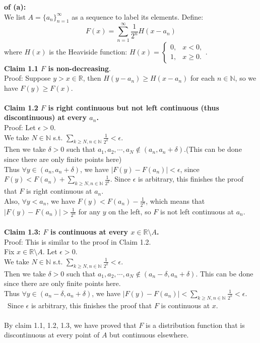 \documentclass[lang=cn,11pt]{elegantbook}
\begin{document}
\begin{solution} \textbf{of (a):}\\
We list \( A = \{a_n\}_{n=1}^{\infty} \) as a sequence to label its elements. Define:
\[
F(x) = \sum_{n=1}^{\infty} \frac{1}{2^n} H(x - a_n)
\]
where \( H(x) \) is the Heaviside function: \(
H(x) =
\begin{cases}
0, & x < 0, \\
1, & x \geq 0.
\end{cases}
\).\\
\textbf{Claim 1.1 $F$ is non-decreasing}.\\
Proof: Suppose $y > x \in \mathbb{R}$, then $H(y-a_n) \geq H(x-a_n)$ for each $n \in \mathbb{N}$, so we have $F(y) \geq F(x)$.\\\\
\textbf{Claim 1.2 $F$ is right continuous but not left continuous (thus discontinuous) at every $a_n$.}\\
Proof: Let $\epsilon > 0$.\\
We take $N \in \mathbb{N}$ s.t. $\sum_{k\geq N, n\in \mathbb{N}} \frac{1}{2^k} < \epsilon$.\\
Then we take $\delta>0$ such that $a_1, a_2,\cdots, a_N \not \in (a_n, a_n+\delta)$.(This can be done since there are only finite points here)\\
Thus $\forall y \in (a_n, a_n+\delta)$, we have $|F(y) - F(a_n)| < \epsilon$, since $F(y) < F(a_n) + \sum_{k\geq N, n\in \mathbb{N}} \frac{1}{2^k}$.
Since $\epsilon$ is arbitrary, this finishes the proof that $F$ is right continuous at $a_n$.\\
Also, $\forall y < a_n$, we have $F(y) < F(a_n) - \frac{1}{2^n}$, which means that $|F(y) -F(a_n)|>\frac{1}{2^n}$ for any $y$ on the left, so $F$ is not left continuous at $a_n$.\\\\
\textbf{Claim 1.3: $F$ is continuous at every $x \in \mathbb{R} \setminus A$.}\\
Proof: This is similar to the proof in Claim 1.2. \\
Fix $x \in \mathbb{R} \setminus A$. Let  $\epsilon > 0$.\\
We take $N \in \mathbb{N}$ s.t. $\sum_{k\geq N, n\in \mathbb{N}} \frac{1}{2^k} < \epsilon$.\\
Then we take $\delta>0$ such that $a_1, a_2,\cdots, a_N \not \in (a_n-\delta, a_n+\delta)$. This can be done since there are only finite points here.\\
Thus $\forall y \in (a_n-\delta, a_n+\delta)$, we have $|F(y) - F(a_n)| <\sum_{k\geq N, n\in \mathbb{N}} \frac{1}{2^k} <  \epsilon$.\\\
Since $\epsilon$ is arbitrary, this finishes the proof that $F$ is continuous at $x$.\\\\

By claim 1.1, 1.2, 1.3, we have proved that $F$ is a distribution function that is discontinuous at every point of $A$ but continuous elsewhere.\\\\
\end{solution}
\end{document}
